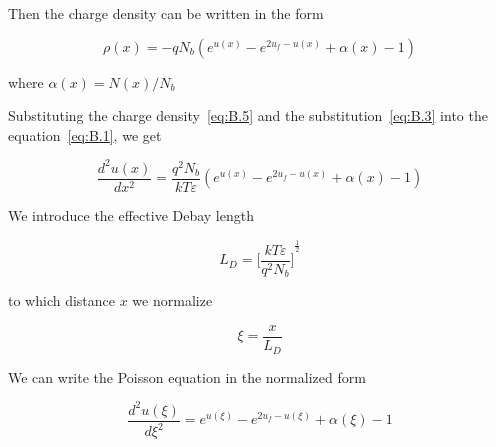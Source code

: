 Then the charge density can be written in the form

\begin{equation}\label{eq:B.5}
  \rho(x) = -qN_b(e^{u(x)} - e^{2u_f-u(x)} + \alpha(x) - 1)
\end{equation}

where $\alpha(x) = {N(x)}/{N_b}$

Substituting the charge density~\ref{eq:B.5} and the
substitution~\ref{eq:B.3} into the equation~\ref{eq:B.1}, we get

\begin{equation}\label{eq:B.6}
  \frac{d^{2}u(x)}{dx^2} = \frac{q^2N_b}{kT\varepsilon}(e^{u(x)} - e^{2u_f-u(x)} + \alpha(x) - 1)
\end{equation}

We introduce the effective Debay length

\begin{equation}\label{eq:B.7}
  L_D = {\Bigg[\frac{kT\varepsilon}{q^{2}N_b}\Bigg]}^{\frac{1}{2}}
\end{equation}

to which distance $x$ we normalize

\begin{equation}\label{eq:B.8}
  \xi = \frac{x}{L_D}
\end{equation}

We can write the Poisson equation in the normalized form

\begin{equation}\label{eq:B.9}
  \frac{d^{2}u(\xi)}{d\xi^2} = e^{u(\xi)} - e^{2u_f-u(\xi)} + \alpha(\xi) - 1
\end{equation}
